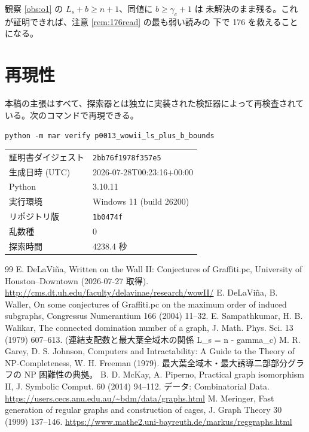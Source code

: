 \documentclass[paper=a4,fontsize=10.5pt,jafontsize=10.5pt]{jlreq}
\theoremstyle{plain}
\theoremstyle{definition}
\begin{document}
観察 \ref{obs:o1} の $L_s + b \ge n + 1$、同値に $b \ge \gamma_c + 1$ は
未解決のまま残る。これが証明できれば、注意 \ref{rem:176read} の最も弱い読みの
下で 176 を救えることになる。


\section*{再現性}
本稿の主張はすべて、探索器とは独立に実装された検証器によって再検査されている。次のコマンドで再現できる。

\begin{center}\texttt{python -m mar verify p0013\_wowii\_ls\_plus\_b\_bounds}\end{center}

\begin{center}\begin{tabular}{ll}\toprule
証明書ダイジェスト & \texttt{2bb76f1978f357e5} \\
生成日時 (UTC) & 2026-07-28T00:23:16+00:00 \\
Python & 3.10.11 \\
実行環境 & Windows 11 (build 26200) \\
リポジトリ版 & \texttt{1b0474f} \\
乱数種 & 0 \\
探索時間 & 4238.4 秒 \\
\bottomrule\end{tabular}\end{center}


\begin{thebibliography}{99}
 E. DeLaViña, Written on the Wall II: Conjectures of Graffiti.pc, University of Houston--Downtown (2026-07-27 取得). \url{http://cms.dt.uh.edu/faculty/delavinae/research/wowII/}
 E. DeLaViña, B. Waller, On some conjectures of Graffiti.pc on the maximum order of induced subgraphs, Congressus Numerantium 166 (2004) 11--32.
 E. Sampathkumar, H. B. Walikar, The connected domination number of a graph, J. Math. Phys. Sci. 13 (1979) 607--613. (連結支配数と最大葉全域木の関係 L\_s = n - gamma\_c)
 M. R. Garey, D. S. Johnson, Computers and Intractability: A Guide to the Theory of NP-Completeness, W. H. Freeman (1979). 最大葉全域木・最大誘導二部部分グラフの NP 困難性の典拠。
 B. D. McKay, A. Piperno, Practical graph isomorphism II, J. Symbolic Comput. 60 (2014) 94--112. データ: Combinatorial Data. \url{https://users.cecs.anu.edu.au/~bdm/data/graphs.html}
 M. Meringer, Fast generation of regular graphs and construction of cages, J. Graph Theory 30 (1999) 137--146. \url{https://www.mathe2.uni-bayreuth.de/markus/reggraphs.html}
\end{thebibliography}
\end{document}
